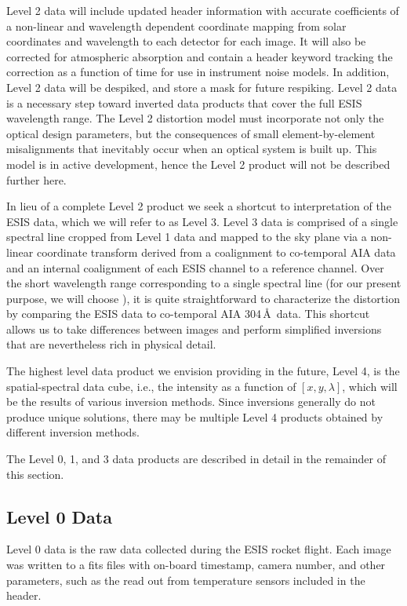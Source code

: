 Level 2 data will include updated header information with accurate coefficients of a non-linear and wavelength dependent coordinate mapping from solar coordinates and wavelength to each detector for each image. It will also be corrected for atmospheric absorption and contain a header keyword tracking the correction as a function of time for use in instrument noise models.
In addition, Level 2 data will be despiked, and store a mask for future respiking.
Level 2 data is a necessary step toward inverted data products that cover the full ESIS wavelength range. The Level 2 distortion model must incorporate not only the optical design parameters, but the consequences of small element-by-element misalignments that inevitably occur when an optical system is built up.  This model is in active development, hence the Level 2 product will not be described further here.


In lieu of a complete Level 2 product we seek a shortcut to interpretation of the ESIS data, which  we will refer to as Level 3.
Level 3 data is comprised of a single spectral line cropped from Level 1 data and mapped to the sky plane via a non-linear coordinate transform derived from a coalignment to co-temporal AIA data and an internal coalignment of each ESIS channel to a reference channel. Over the short wavelength range corresponding to a single spectral line (for our present purpose, we will choose \ov), it is quite straightforward to characterize the distortion by comparing the ESIS data to co-temporal AIA 304\,\AA\ data. This shortcut allows us to take differences between images and perform simplified inversions that are nevertheless rich in physical detail.

The highest level data product we envision providing in the future, Level 4, is the spatial-spectral data cube, i.e., the intensity as a function of $[x, y , \lambda]$, which will be the results of various inversion methods.    
Since inversions generally do not produce unique solutions, there may be multiple Level 4 products obtained by different inversion methods.
   

The Level 0, 1, and 3 data products are described in detail in the remainder of this section. 


    
\subsection{Level 0 Data}
    
Level 0 data is the raw data collected during the ESIS rocket flight.  
Each image was written to a fits files with on-board timestamp, camera number, and other parameters, such as the read out from temperature sensors included in the header.   

